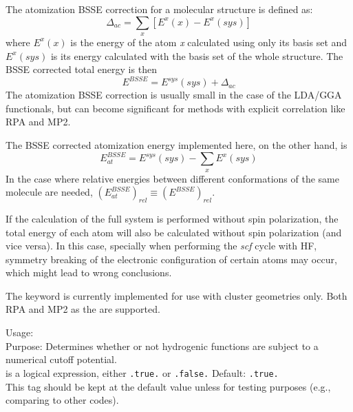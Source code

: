The atomization BSSE correction for a molecular structure is defined
as: 
\begin{equation}
  \Delta_{ac}=\sum_x[E^x(x)-E^x(sys)]
\end{equation}
where $E^x(x)$ is the energy of the atom \textit{x} calculated using
only its basis set and $E^x(sys)$ is its energy calculated with the
basis set of the whole structure. The BSSE corrected total energy is
then 
\begin{equation}
  E^{BSSE}=E^{sys}(sys)+\Delta_{ac}
\end{equation}
The atomization BSSE correction is usually small in the case of the
LDA/GGA functionals, but can become significant for methods with
explicit correlation like RPA and MP2. 

The BSSE corrected atomization energy implemented here, on the other hand, is 
\begin{equation}
  E^{BSSE}_{at}=E^{sys}(sys)-\sum_x E^x(sys)
\end{equation}
In the case where relative energies between different conformations of
the same molecule are needed,
$(E^{BSSE}_{at})_{rel}\equiv(E^{BSSE})_{rel}$. 

If the calculation of the full system is performed without spin
polarization, the total energy of each atom will also be calculated
without spin polarization (and vice versa). In this case, specially
when performing the \textit{scf} cycle with HF, symmetry breaking of
the electronic configuration of certain atoms may occur, which might
lead to wrong conclusions. 

The keyword is currently implemented for use with cluster geometries
only. Both RPA and MP2 as the  are
supported. 

{
  \noindent
  Usage:   \\[1.0ex]
  Purpose: Determines whether or not hydrogenic functions are subject
    to a numerical cutoff potential. \\[1.0ex] 
   is a logical expression, either \texttt{.true.} or
    \texttt{.false.} Default: \texttt{.true.} \\
}
This tag should be kept at the default value unless for testing
purposes (e.g., comparing to other codes). 

